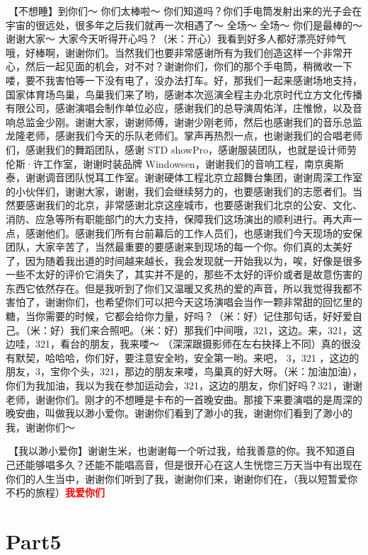 \documentclass[
]{book}
\begin{document}
🎵【不想睡】到你们～ 你们太棒啦～ 你们知道吗？你们手电筒发射出来的光子会在宇宙的很远处，很多年之后我们就再一次相遇了～ 全场～ 全场～ 你们是最棒的～ 谢谢大家～
大家今天听得开心吗？（米：开心）我看到好多人都好漂亮好帅气哦，好棒啊，谢谢你们。当然我们也要非常感谢所有为我们创造这样一个非常开心，然后一起见面的机会，对不对？谢谢你们，你们的那个手电筒，稍微收一下喽，要不我害怕等一下没有电了，没办法打车。好，那我们一起来感谢场地支持，国家体育场鸟巢，鸟巢我们来了哟，感谢本次巡演全程主办北京时代立方文化传播有限公司，感谢演唱会制作单位必应，感谢我们的总导演周佑洋，庄惟惞，以及音响总监金少刚。谢谢大家，谢谢师傅，谢谢少刚老师，然后也感谢我们的音乐总监龙隆老师，感谢我们今天的乐队老师们。掌声再热烈一点，也谢谢我们的合唱老师们，感谢我们的舞蹈团队，感谢 STD showPro，感谢服装团队，也就是设计师劳伦斯·许工作室，谢谢时装品牌 Windowsen，谢谢我们的音响工程，南京奥斯泰，谢谢调音团队悦耳工作室。谢谢硬体工程北京立超舞台集团，谢谢周深工作室的小伙伴们，谢谢大家，谢谢，我们会继续努力的，也要感谢我们的志愿者们。当然要感谢我们的北京，非常感谢北京这座城市，也要感谢我们北京的公安、文化、消防、应急等所有职能部门的大力支持，保障我们这场演出的顺利进行。再大声一点，感谢他们。感谢我们所有台前幕后的工作人员们，也感谢我们今天现场的安保团队，大家辛苦了，当然最重要的要感谢来到现场的每一个你。你们真的太美好了，因为随着我出道的时间越来越长，我会发现就一开始我以为，唉，好像是很多一些不太好的评价它消失了，其实并不是的，那些不太好的评价或者是故意伤害的东西它依然存在。但是我听到了你们又温暖又炙热的爱的声音，所以我觉得我都不害怕了，谢谢你们，也希望你们可以把今天这场演唱会当作一颗非常甜的回忆里的糖，当你需要的时候，它都会给你力量，好吗？（米：好）记住那句话，好好爱自己。（米：好）我们来合照吧。（米：好）那我们中间哦，321，这边。来，321，这边哇，321，看台的朋友，我来喽～ （深深跟摄影师在左右抉择上不同）真的很没有默契，哈哈哈，你们好，要注意安全哟，安全第一哟。来吧， 3，321 ，这边的朋友，3，宝你个头，321，那边的朋友来喽，鸟巢真的好大呀。（米：加油加油），你们为我加油，我以为我在参加运动会，321，这边的朋友，你们好吗？321，谢谢老师，谢谢你们。刚才的不想睡是卡布的一首晚安曲。那接下来要演唱的是周深的晚安曲，叫做我以渺小爱你。谢谢你们看到了渺小的我，谢谢你们看到了渺小的我，谢谢你们～

🎵【我以渺小爱你】谢谢生米，也谢谢每一个听过我，给我善意的你。我不知道自己还能够唱多久？还能不能唱高音，但是很开心在这人生恍惚三万天当中有出现在你们的人生当中，谢谢你们听到了我，谢谢你们来，谢谢你们在，（我以短暂爱你不朽的旅程）\textbf{\textcolor{red}{我爱你们~} }

\section{Part5}\label{beijing-20240921-part5}
\end{document}
